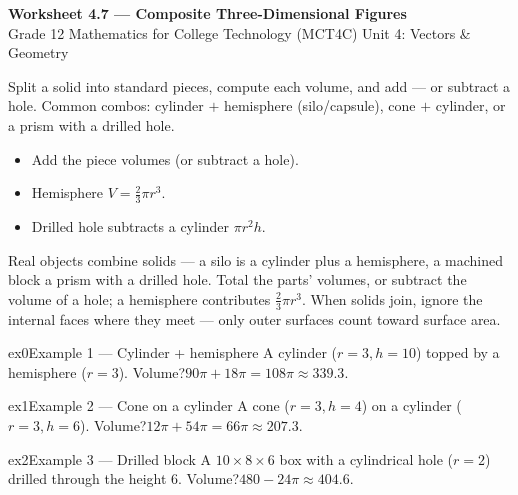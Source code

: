 \documentclass[11pt]{article}
\begin{document}
\begin{center}
{\LARGE\bfseries\color{titleblue}Worksheet 4.7 --- Composite Three-Dimensional Figures}\\[2pt]
{\small Grade 12 Mathematics for College Technology (MCT4C) \textperiodcentered{} Unit 4: Vectors \& Geometry}
\end{center}

\begin{ideabox}
Split a solid into standard pieces, compute each volume, and add — or subtract a hole. Common combos: cylinder $+$ hemisphere (silo/capsule), cone $+$ cylinder, or a prism with a drilled hole.
\begin{itemize}[leftmargin=*,itemsep=2pt]
  \item Add the piece volumes (or subtract a hole).
  \item Hemisphere $V=\tfrac23\pi r^3$.
  \item Drilled hole subtracts a cylinder $\pi r^2 h$.
\end{itemize}
\end{ideabox}

\begin{learnbox}
Real objects combine solids — a silo is a cylinder plus a hemisphere, a machined block a prism with a drilled hole.
Total the parts' volumes, or subtract the volume of a hole; a hemisphere contributes $\tfrac23\pi r^3$.
When solids join, ignore the internal faces where they meet — only outer surfaces count toward surface area.
\end{learnbox}


\begin{example}{ex0}{Example 1 --- Cylinder + hemisphere}
A cylinder ($r=3,h=10$) topped by a hemisphere ($r=3$). Volume?\soln $90\pi+18\pi=108\pi\approx339.3$.
\end{example}

\begin{example}{ex1}{Example 2 --- Cone on a cylinder}
A cone ($r=3,h=4$) on a cylinder ($r=3,h=6$). Volume?\soln $12\pi+54\pi=66\pi\approx207.3$.
\end{example}

\begin{example}{ex2}{Example 3 --- Drilled block}
A $10\times8\times6$ box with a cylindrical hole ($r=2$) drilled through the height $6$. Volume?\soln $480-24\pi\approx404.6$.
\end{example}
\end{document}
